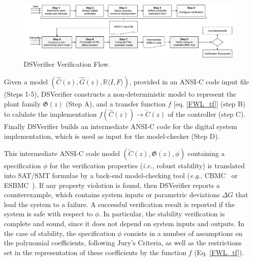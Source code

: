 \documentclass{sig-alternate-05-2015}
\begin{document}
\begin{figure}[t]
\centering
\includegraphics[width=\textwidth]{figures/verification-flow.pdf}
\caption{DSVerifier Verification Flow.}
\label{DSVerifier_process}
\end{figure}


Given a model $(\hat{C}(z),\hat{G}(z), \mathbb{R}\langle I,F \rangle)$, provided
in an ANSI-C code input file (Steps 1-5),
DSVerifier constructs a non-deterministic model to represent the plant family
$\mathfrak{G}(z)$ (Step A), and a transfer function $f$ [eq. \ref{FWL_tf}]
(step B) to calulate the implementation $f(\hat{C}(z)) \rightarrow \tilde C(z)$
of the controller (step C).
Finally DSVerifier builds an intermediate ANSI-C code for the digital system
implementation, which is used as input for the model-checker (Step D).

This intermediate ANSI-C code model $(\tilde C(z),\mathfrak{G}(z),\phi)$
containing a specification $\phi$ for the verification properties ({\it i.e.}, robust stability)
is translated into SAT/SMT formulae by a back-end model-checking tool ({\it e.g.},
CBMC~\cite{ClarkeKL04} or ESBMC~\cite{CordeiroFM12}).
If any property violation is found, then DSVerifier reports a
counterexample, which contains system inputs or parametric deviations
$\Delta{G}$ that lead the system to a failure.  A successful verification
result is reported if the system is safe with respect to $\phi$.  In
particular, the stability verification is complete and sound, since it does
not depend on system inputs and outputs.
In the case of stability, the specification $\phi$ consists in a number of assumptions
on the polynomial coefficients, following Jury's Criteria, as well as the restrictions
set in the representation of these coefficients by the function $f$ (Eq. \ref{FWL_tf}).
\end{document}
